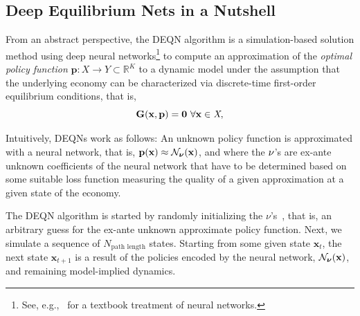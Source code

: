\documentclass[11pt, a4paper, pdftex, twoside, dvipsnames]{article}
\newcommand{\p}{\mathbf{p}}
\newcommand{\nn}{\mathcal{N}_{\bm{\nu}}}
\newcommand{\x}{\mathbf{x}}
\begin{document}
\begin{appendices}
\subsection{Deep Equilibrium Nets in a Nutshell}
\label{sec:DEQNs}

From an abstract perspective, the DEQN algorithm 
is a simulation-based solution method using deep neural networks\footnote{See, e.g.,~\cite{Goodfellow-et-al-2016} for a textbook treatment of neural networks.} to compute an approximation of the \textit{optimal policy function} $\p : X \rightarrow Y \subset \mathbb{R}^K$ to a dynamic model under the assumption that the underlying economy can be characterized via discrete-time first-order equilibrium conditions, that is, 
%
\begin{equation}
  \textbf{G}(\x, {\bf{p}})=\bf{0} \ \forall \x \in {\textit{X}},  
  \label{eq:FOC_example}
\end{equation}
%

Intuitively, DEQNs work as follows: An unknown policy function is approximated with a neural network, that is, $\p(\bf{x})\approx\nn(\bf{x})$, and where the $\bf{\nu}$'s are ex-ante unknown coefficients of the neural network that have to be determined based on some suitable loss function measuring the quality of a given approximation at a given state of the economy. 

The DEQN algorithm is started by randomly initializing the $\nu$'s~\citep{pmlr-v9-glorot10a}, that is, an arbitrary guess for the ex-ante unknown approximate policy function. 
Next, we simulate a sequence of $N_{\text{path length}}$ states.
Starting from some given state $\x_t$, the next state $\x_{t+1}$ is a result of the policies encoded by the neural network, $\nn(\bf{x})$, and remaining model-implied dynamics.


\end{appendices}
\end{document}
